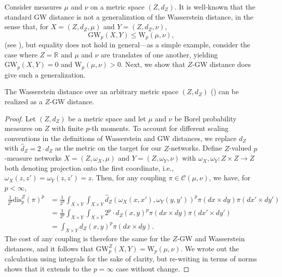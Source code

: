 \documentclass[twoside,11pt]{article}
\theoremstyle{definition}
\newcommand{\dgwz}{\mathrm{GW}_p^Z}
\newcommand{\R}{\mathbb{R}}
\begin{document}
Consider measures $\mu$ and $\nu$ on a metric space $(Z,d_Z)$. It is well-known that the standard GW distance is not a generalization of the Wasserstein distance, in the sense that, for $X = (Z,d_Z,\mu)$ and $Y = (Z,d_Z,\nu)$, 
    \begin{equation}
     \mathrm{GW}_p(X,Y) \leq \mathrm{W}_p(\mu,\nu),
    \end{equation}
(see \citealt[Theorem 5.1(c)]{memoli2011}), but equality does not hold in general---as a simple example, consider the case where $Z = \R$ and $\mu$ and $\nu$ are translates of one another, yielding $\mathrm{GW}_p(X,Y) = 0$ and $\mathrm{W}_p(\mu,\nu) > 0$. Next, we show that $Z$-GW distance does give such a generalization.

\begin{proposition}\label{prop:WasZGW}
    The Wasserstein distance over an arbitrary metric space $(Z,d_Z)$ () can be realized as a $Z$-GW distance.
\end{proposition}

\begin{proof}
    Let $(Z,d_Z)$ be a metric space and let $\mu$ and $\nu$ be Borel probability measures on $Z$ with finite $p$-th moments. To account for different scaling conventions in the definitions of Wasserstein and GW distances, we replace $d_Z$ with $\hat{d}_Z = 2 \cdot d_Z$ as the metric on the target for our $Z$-networks. Define $Z$-valued $p$-measure networks $X = (Z,\omega_X,\mu)$ and $Y = (Z,\omega_Y,\nu)$ with $\omega_X, \omega_Y:Z \times Z \to Z$ both denoting projection onto the first coordinate, i.e., $\omega_X(z,z') = \omega_Y(z,z') = z$. Then, for any coupling $\pi \in \mathcal{C}(\mu,\nu)$, we have, for $p < \infty$,
    \begin{align} 
        \frac{1}{2^p} \mathrm{dis}_p^Z(\pi)^p & = \frac{1}{2^p}\int_{X \times Y} \int_{X \times Y} \hat{d}_Z(\omega_X(x,x'),\omega_Y(y,y'))^p \pi(dx \times dy) \pi(dx' \times dy') \\
        & = \frac{1}{2^p}\int_{X \times Y} \int_{X \times Y} 2^p \cdot d_Z(x,y)^p \pi(dx \times dy) \pi(dx' \times dy') \\
                     & = \int_{X \times Y} d_Z(x,y)^p \pi(dx \times dy).
    \end{align}
    The cost of any coupling is therefore the same for the $Z$-GW and Wasserstein distances, and it follows that $\dgwz(X,Y) = \mathrm{W}_p(\mu,\nu)$. We wrote out the calculation using integrals for the sake of clarity, but re-writing in terms of norms shows that it extends to the $p=\infty$ case without change.
\end{proof}
\end{document}
